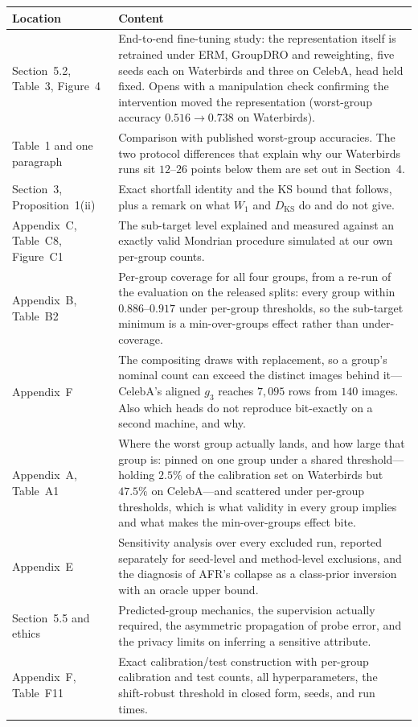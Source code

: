 \documentclass[11pt,a4paper]{article}
\newcommand{\now}[1]{\textcolor{addblue}{#1}}
\begin{document}
\begin{center}
\begin{tabular}{@{}L{3.0cm}L{11.5cm}@{}}
\toprule
\textbf{Location} & \textbf{Content} \\
\midrule
Section~5.2, Table~3, Figure~4 & \now{End-to-end fine-tuning study: the representation
itself is retrained under ERM, GroupDRO and reweighting, five seeds each on Waterbirds and three
on CelebA, head held fixed. Opens
with a manipulation check confirming the intervention moved the representation (worst-group
accuracy $0.516 \to 0.738$ on Waterbirds).} \\
\addlinespace
Table~1 and one paragraph & \now{Comparison with published worst-group accuracies. The
two protocol differences that explain why our Waterbirds runs sit $12$--$26$ points below
them are set out in Section~4.} \\
\addlinespace
Section~3, Proposition~1(ii) & \now{Exact shortfall identity and the KS bound that follows, plus a
remark on what $W_1$ and $D_{\mathrm{KS}}$ do and do not give.} \\
\addlinespace
Appendix~C, Table~C8, Figure~C1 & \now{The sub-target level explained and measured
against an exactly valid Mondrian procedure simulated at our own per-group counts.} \\
\addlinespace
Appendix~B, Table~B2 & \now{Per-group coverage for all four groups, from a re-run of the
evaluation on the released splits: every group within $0.886$--$0.917$ under per-group thresholds,
so the sub-target minimum is a min-over-groups effect rather than under-coverage.} \\
\addlinespace
Appendix~F & \now{The compositing draws with replacement, so a group's nominal count can exceed the
distinct images behind it---CelebA's aligned $g_3$ reaches $7{,}095$ rows from $140$ images. Also
which heads do not reproduce bit-exactly on a second machine, and why.} \\
\addlinespace
Appendix~A, Table~A1 & \now{Where the worst group actually lands, and how large that group
is: pinned on one group under a shared threshold---holding $2.5\%$ of the calibration set on
Waterbirds but $47.5\%$ on CelebA---and scattered under per-group thresholds, which is what
validity in every group implies and what makes the min-over-groups effect bite.} \\
\addlinespace
Appendix~E & \now{Sensitivity analysis over every excluded run, reported separately for
seed-level and method-level exclusions, and the diagnosis of AFR's collapse as a class-prior
inversion with an oracle upper bound.} \\
\addlinespace
Section~5.5 and ethics & \now{Predicted-group mechanics, the supervision actually required,
the asymmetric propagation of probe error, and the privacy limits on inferring a sensitive
attribute.} \\
\addlinespace
Appendix~F, Table~F11 & \now{Exact calibration/test construction with per-group
calibration and test counts, all hyperparameters, the shift-robust threshold in closed form, seeds,
and run times.} \\
\bottomrule
\end{tabular}
\end{center}
\end{document}

